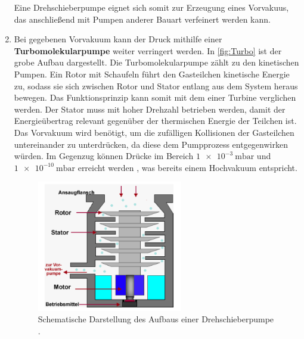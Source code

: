 \begin{enumerate}
    Eine Drehschieberpumpe eignet sich somit zur Erzeugung eines Vorvakuus, das anschließend mit Pumpen anderer Bauart verfeinert werden kann.
    \item Bei gegebenen Vorvakuum kann der Druck mithilfe einer \textbf{Turbomolekularpumpe} weiter verringert werden.
    In \autoref{fig:Turbo} ist der grobe Aufbau dargestellt.
    Die Turbomolekularpumpe zählt zu den kinetischen Pumpen. Ein Rotor mit Schaufeln führt den Gasteilchen kinetische Energie zu, sodass sie
    sich zwischen Rotor und Stator entlang aus dem System heraus bewegen. Das Funktionsprinzip kann somit mit dem einer Turbine verglichen werden. Der
    Stator muss mit hoher Drehzahl betrieben werden, damit der Energieübertrag relevant gegenüber der thermischen Energie der Teilchen ist.
    Das Vorvakuum wird benötigt, um die zufälligen Kollisionen der Gasteilchen untereinander zu unterdrücken, da diese dem Pumpprozess entgegenwirken
    würden. Im Gegenzug können Drücke im Bereich $\qty{1e-3}{\milli\bar}$ und $\qty{1e-10}{\milli\bar}$ erreicht werden \cite{Pfeiffer_Turbomolekularpumpen},
    was bereits einem Hochvakuum entspricht.
    \begin{figure}[H]
        \centering
        \includegraphics[width=0.6\textwidth]{content/pics/turbo.png}
        \caption{Schematische Darstellung des Aufbaus einer Drehschieberpumpe \cite{Turbopumpe}.}
        \label{fig:Turbo}
    \end{figure}
\end{enumerate}

